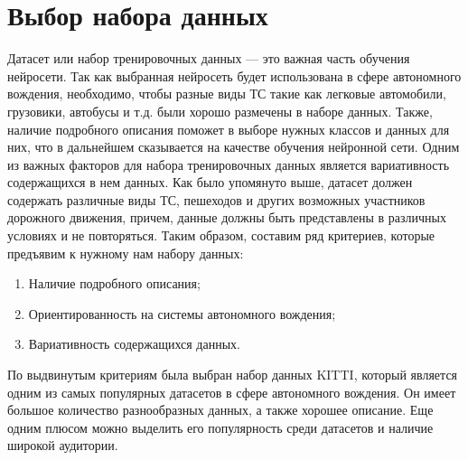 \chapter {Выбор набора данных}

Датасет или набор тренировочных данных --- это важная часть обучения нейросети. 
Так как выбранная нейросеть будет использована в сфере автономного вождения, 
необходимо, чтобы разные виды ТС такие как легковые автомобили, грузовики, 
автобусы и т.д. были хорошо размечены в наборе данных. Также, наличие подробного
описания поможет в выборе нужных классов и данных для них, что в дальнейшем
сказывается на качестве обучения нейронной сети. Одним из важных факторов для 
набора тренировочных данных является вариативность содержащихся в нем данных.
Как было упомянуто выше, датасет должен содержать различные виды ТС, пешеходов и 
других возможных участников дорожного движения, причем, данные должны быть представлены
в различных условиях и не повторяться. Таким образом, составим ряд критериев, 
которые предъявим к нужному нам набору данных:

\begin{enumerate}

	\item Наличие подробного описания;
	
	\item Ориентированность на системы автономного вождения;
	
	\item Вариативность содержащихся данных.
	
\end{enumerate}

По выдвинутым критериям была выбран набор данных KITTI, который является одним из самых популярных
датасетов в сфере автономного вождения. Он имеет большое количество разнообразных данных, а также
хорошее описание. Еще одним плюсом можно выделить его популярность среди датасетов и наличие
широкой аудитории.


